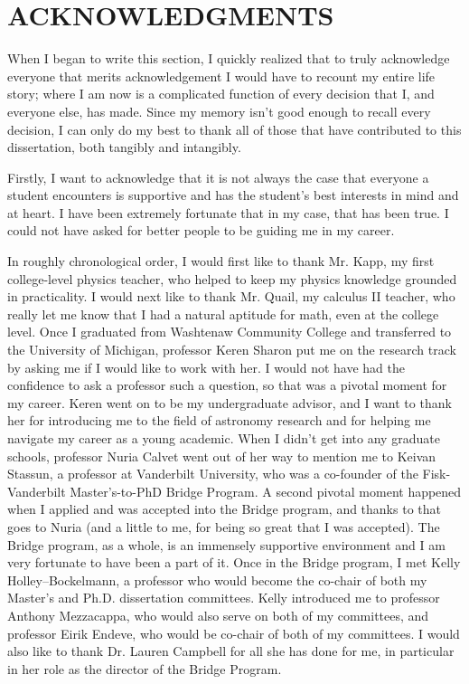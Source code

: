 
\chapter*{ACKNOWLEDGMENTS}
\vspace{7mm}

\begin{doublespace}

When I began to write this section, I quickly realized that to truly
acknowledge everyone that merits acknowledgement I would have to recount
my entire life story;
where I am now is a complicated function
of every decision that I, and everyone else, has made.
Since my memory isn't good enough to recall every decision, I can only do my
best to thank all of those that have contributed to this dissertation,
both tangibly and intangibly.

Firstly, I want to acknowledge that it is not always the case that everyone
a student encounters is supportive and has the student's best interests
in mind and at heart.
I have been extremely fortunate that in my case, that has been true.
I could not have asked for better people to be guiding me in my career.

In roughly chronological order, I would first like to thank Mr. Kapp,
my first college-level physics teacher, who
helped to keep my physics knowledge grounded in practicality.
I would next like to thank Mr. Quail, my calculus II teacher,
who really let me know that I had
a natural aptitude for math, even at the college level.
Once I graduated from Washtenaw Community College and transferred to the
University of Michigan, professor Keren Sharon put me on the research track
by asking me if I would like to work with her.
I would not have had the confidence to ask a professor such a question,
so that was a pivotal moment for my career.
Keren went on to be my undergraduate advisor, and I want to thank her for
introducing me to the field of astronomy research and for
helping me navigate my career as a young academic.
When I didn't get into any graduate schools, professor Nuria Calvet went out
of her way to mention me to Keivan Stassun, a professor at
Vanderbilt University,
who was a co-founder of the Fisk-Vanderbilt Master's-to-PhD Bridge Program.
A second pivotal moment happened when I applied and was accepted into the
Bridge program, and thanks to that goes to Nuria (and a little to me,
for being so great that I was accepted).
The Bridge program, as a whole, is an immensely supportive environment
and I am very fortunate to have been a part of it.
Once in the Bridge program,
I met Kelly Holley--Bockelmann, a professor who would become the
co-chair of both my Master's and Ph.D. dissertation committees.
Kelly introduced me to professor Anthony Mezzacappa,
who would also serve on both of my
committees, and professor Eirik Endeve,
who would be co-chair of both of my committees.
I would also like to thank Dr. Lauren Campbell for all she has done for
me, in particular in her role as the director of the Bridge Program.


\end{doublespace}
